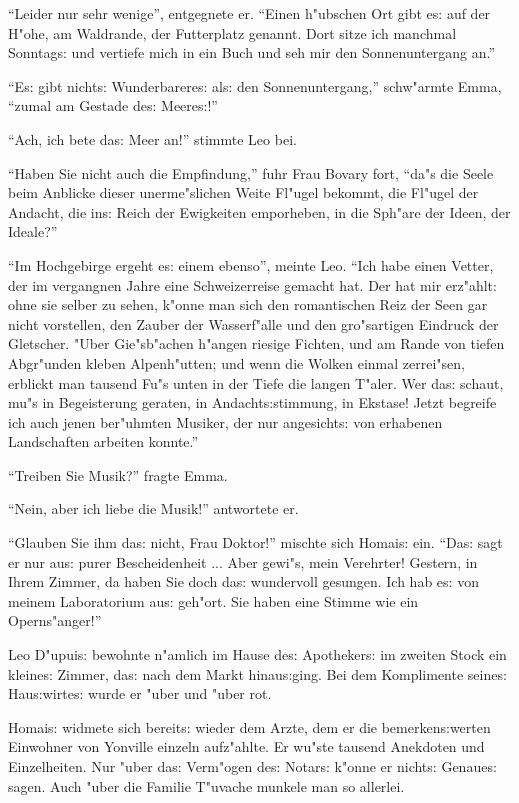 \documentclass[oneside,12pt]{book}
\newcommand{\s}{s:}%
\begin{document}
"`Leider nur sehr wenige"', entgegnete er. "`Einen h"ubschen Ort
gibt e{\s} auf der H"ohe, am Waldrande, der
{\glq}Futterplatz{\grq} genannt. Dort sitze ich manchmal
Sonntag{\s} und vertiefe mich in ein Buch und seh mir den
Sonnenuntergang an."'

"`E{\s} gibt nicht{\s} Wunderbarere{\s} al{\s} den Sonnenuntergang,"'
schw"armte Emma, "`zumal am Gestade de{\s} Meere{\s}!"'

"`Ach, ich bete da{\s} Meer an!"' stimmte Leo bei.

"`Haben Sie nicht auch die Empfindung,"' fuhr Frau Bovary fort,
"`da"s die Seele beim Anblicke dieser unerme"slichen Weite Fl"ugel
bekommt, die Fl"ugel der Andacht, die in{\s} Reich der Ewigkeiten
emporheben, in die Sph"are der Ideen, der Ideale?"'

"`Im Hochgebirge ergeht e{\s} einem ebenso"', meinte Leo. "`Ich
habe einen Vetter, der im vergangnen Jahre eine Schweizerreise
gemacht hat. Der hat mir erz"ahlt: ohne sie selber zu sehen,
k"onne man sich den romantischen Reiz der Seen gar nicht
vorstellen, den Zauber der Wasserf"alle und den gro"sartigen
Eindruck der Gletscher. "Uber Gie"sb"achen h"angen riesige
Fichten, und am Rande von tiefen Abgr"unden kleben Alpenh"utten;
und wenn die Wolken einmal zerrei"sen, erblickt man tausend Fu"s
unten in der Tiefe die langen T"aler. Wer da{\s} schaut, mu"s in
Begeisterung geraten, in Andacht{\s}stimmung, in Ekstase! Jetzt
begreife ich auch jenen ber"uhmten Musiker, der nur angesicht{\s}
von erhabenen Landschaften arbeiten konnte."'

"`Treiben Sie Musik?"' fragte Emma.

"`Nein, aber ich liebe die Musik!"' antwortete er.

"`Glauben Sie ihm da{\s} nicht, Frau Doktor!"' mischte sich
Homai{\s} ein. "`Da{\s} sagt er nur au{\s} purer Bescheidenheit
... Aber gewi"s, mein Verehrter! Gestern, in Ihrem Zimmer, da
haben Sie doch da{\s}  wundervoll gesungen. Ich hab
e{\s} von meinem Laboratorium au{\s} geh"ort. Sie haben eine
Stimme wie ein Operns"anger!"'

Leo D"upui{\s} bewohnte n"amlich im Hause de{\s} Apotheker{\s} im
zweiten Stock ein kleine{\s} Zimmer, da{\s} nach dem Markt
hinau{\s}ging. Bei dem Komplimente seine{\s} Hau{\s}wirte{\s}
wurde er "uber und "uber rot.

Homai{\s} widmete sich bereit{\s} wieder dem Arzte, dem er die
bemerken{\s}werten Einwohner von Yonville einzeln aufz"ahlte. Er
wu"ste tausend Anekdoten und Einzelheiten. Nur "uber da{\s}
Verm"ogen de{\s} Notar{\s} k"onne er nicht{\s} Genaue{\s} sagen.
Auch "uber die Familie T"uvache munkele man so allerlei.
\end{document}
